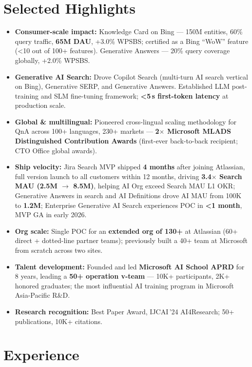 \documentclass[10.5pt,letterpaper]{article}
\begin{document}
\section*{Selected Highlights}
\begin{itemize}
  \item \textbf{Consumer-scale impact:} Knowledge Card on Bing — 150M entities, 60\% query traffic, \textbf{65M DAU}, +3.0\% WPSBS; certified as a Bing ``WoW'' feature (<10 out of 100+ features). Generative Answers — 20\% query coverage globally, +2.0\% WPSBS.
  \item \textbf{Generative AI Search:} Drove Copilot Search (multi-turn AI search vertical on Bing), Generative SERP, and Generative Answers. Established LLM post-training and SLM fine-tuning framework; \textbf{<5\,s first-token latency} at production scale.
  \item \textbf{Global \& multilingual:} Pioneered cross-lingual scaling methodology for QnA across 100+ languages, 230+ markets — \textbf{2$\times$ Microsoft MLADS Distinguished Contribution Awards} (first-ever back-to-back recipient; CTO Office global awards).
  \item \textbf{Ship velocity:} Jira Search MVP shipped \textbf{4 months} after joining Atlassian, full version launch to all customers within 12 months, driving \textbf{3.4$\times$ Search MAU (2.5M $\to$ 8.5M)}, helping AI Org exceed Search MAU L1 OKR; Generative Answers in search and AI Definitions drove AI MAU from 100K to \textbf{1.2M}; Enterprise Generative AI Search experiences POC in \textbf{<1 month}, MVP GA in early 2026.
  \item \textbf{Org scale:} Single POC for an \textbf{extended org of 130+} at Atlassian (60+ direct + dotted-line partner teams); previously built a 40+ team at Microsoft from scratch across two sites.
  \item \textbf{Talent development:} Founded and led \textbf{Microsoft AI School APRD} for 8 years, leading a \textbf{50+ operation v-team} — 10K+ participants, 2K+ honored graduates; the most influential AI training program in Microsoft Asia-Pacific R\&D.
  \item \textbf{Research recognition:} Best Paper Award, IJCAI\,'24 AI4Research; 50+ publications, 10K+ citations.
\end{itemize}

\section*{Experience}
\end{document}
